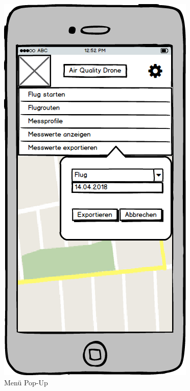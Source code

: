 \begin{figure}
	\centering
	\includegraphics[scale=0.8]{images/MenuePopUp}
	\caption{Menü Pop-Up}
\end{figure}
\newpage

